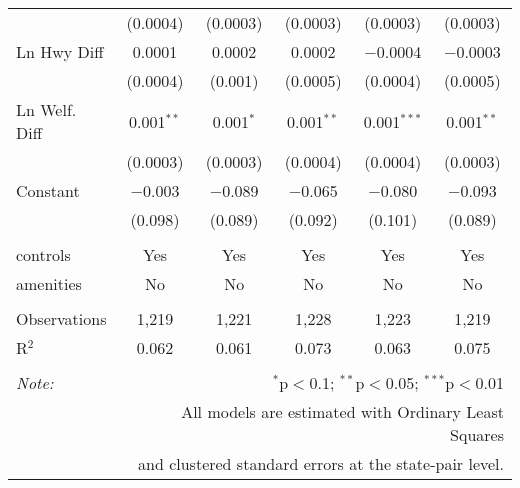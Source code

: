 \begin{table}[!htbp]
\begin{tabular}{@{\extracolsep{5pt}}lccccc}
  & (0.0004) & (0.0003) & (0.0003) & (0.0003) & (0.0003) \\ 
  Ln Hwy Diff & 0.0001 & 0.0002 & 0.0002 & $-$0.0004 & $-$0.0003 \\ 
  & (0.0004) & (0.001) & (0.0005) & (0.0004) & (0.0005) \\ 
  Ln Welf. Diff & 0.001$^{**}$ & 0.001$^{*}$ & 0.001$^{**}$ & 0.001$^{***}$ & 0.001$^{**}$ \\ 
  & (0.0003) & (0.0003) & (0.0004) & (0.0004) & (0.0003) \\ 
  Constant & $-$0.003 & $-$0.089 & $-$0.065 & $-$0.080 & $-$0.093 \\ 
  & (0.098) & (0.089) & (0.092) & (0.101) & (0.089) \\ 
 \hline \\[-1.8ex] 
controls & Yes & Yes & Yes & Yes & Yes \\ 
amenities & No & No & No & No & No \\ 
\hline \\[-1.8ex] 
Observations & 1,219 & 1,221 & 1,228 & 1,223 & 1,219 \\ 
R$^{2}$ & 0.062 & 0.061 & 0.073 & 0.063 & 0.075 \\ 
\hline 
\hline \\[-1.8ex] 
\textit{Note:}  & \multicolumn{5}{r}{$^{*}$p$<$0.1; $^{**}$p$<$0.05; $^{***}$p$<$0.01} \\ 
 & \multicolumn{5}{r}{All models are estimated with Ordinary Least Squares} \\ 
 & \multicolumn{5}{r}{and clustered standard errors at the state-pair level.} \\ 
\end{tabular} 
\end{table} 
